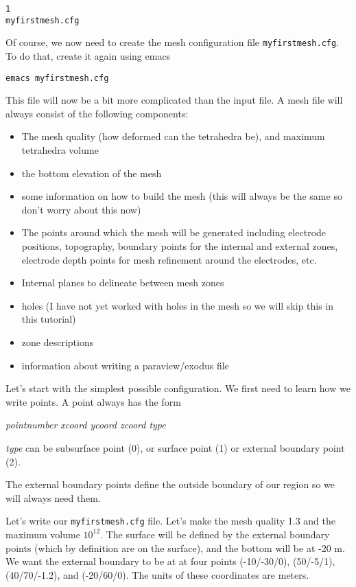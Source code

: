 \documentclass[11pt]{article}
\begin{document}
\verb+1+\\
\verb+myfirstmesh.cfg+

Of course, we now need to create the mesh configuration file
\verb+myfirstmesh.cfg+. To do that, create it again using emacs

\qquad \verb+emacs myfirstmesh.cfg+

This file will now be a bit more complicated than the input file.
A mesh file will always consist of the following components:
\begin{itemize}
\item The mesh quality (how deformed can the tetrahedra be), and
  maximum tetrahedra volume
\item the bottom elevation of the mesh
\item some information on how to build the mesh (this will always be
  the same so don't worry about this now)
\item The points around which the mesh will be generated including
  electrode positions, topography, boundary points for the internal
  and external zones, electrode depth points for mesh refinement
  around the electrodes, etc.
\item Internal planes to delineate between mesh zones
\item holes (I have not yet worked with holes in the mesh so we will
  skip this in this tutorial)
\item zone descriptions
\item information about writing a paraview/exodus file
\end{itemize}

Let's start with the simplest possible configuration. We first need to
learn how we write points. A point always has the form

\emph{pointnumber xcoord ycoord zcoord type}

\emph{type} can be subsurface point (0), or surface point (1) or
external boundary point (2).

The external boundary points define the outside boundary of our region
so we will always need them.

Let's write our \verb+myfirstmesh.cfg+ file. Let's make the mesh
quality 1.3 and the maximum volume $10^{12}$. The surface will be
defined by the external boundary points (which by definition are on
the surface), and the bottom will be at -20 m. We want the external
boundary to be at at four points (-10/-30/0), (50/-5/1), (40/70/-1.2),
and (-20/60/0). The units of these coordinates are meters.
\end{document}
